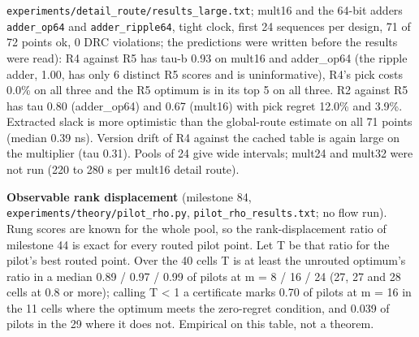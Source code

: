 \documentclass[conference]{IEEEtran}
\begin{document}
\texttt{experiments/\allowbreak{}detail\_\allowbreak{}route/\allowbreak{}results\_\allowbreak{}large.txt}; mult16 and the
64-bit adders \texttt{adder\_\allowbreak{}op64} and \texttt{adder\_\allowbreak{}ripple64}, tight
clock, first 24 sequences per design, 71 of 72 points ok, 0 DRC
violations; the predictions were written before the results were read):
R4 against R5 has tau-b 0.93 on mult16 and adder\_op64 (the ripple
adder, 1.00, has only 6 distinct R5 scores and is uninformative), R4's
pick costs 0.0\% on all three and the R5 optimum is in its top 5 on all
three. R2 against R5 has tau 0.80 (adder\_op64) and 0.67 (mult16) with
pick regret 12.0\% and 3.9\%. Extracted slack is more optimistic than
the global-route estimate on all 71 points (median 0.39 ns). Version
drift of R4 against the cached table is again large on the multiplier
(tau 0.31). Pools of 24 give wide intervals; mult24 and mult32 were not
run (220 to 280 s per mult16 detail route).

\textbf{Observable rank displacement} (milestone 84,
\texttt{experiments/\allowbreak{}theory/\allowbreak{}pilot\_\allowbreak{}rho.py},
\texttt{pilot\_\allowbreak{}rho\_\allowbreak{}results.txt}; no flow run). Rung scores are known
for the whole pool, so the rank-displacement ratio of milestone 44 is
exact for every routed pilot point. Let T be that ratio for the pilot's
best routed point. Over the 40 cells T is at least the unrouted
optimum's ratio in a median 0.89 / 0.97 / 0.99 of pilots at m = 8 / 16 /
24 (27, 27 and 28 cells at 0.8 or more); calling T \textless{} 1 a
certificate marks 0.70 of pilots at m = 16 in the 11 cells where the
optimum meets the zero-regret condition, and 0.039 of pilots in the 29
where it does not. Empirical on this table, not a theorem.
\end{document}
